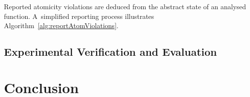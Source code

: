 Reported atomicity violations are deduced from the abstract state of
an analysed function. A~simplified reporting process illustrates
Algorithm~\ref{alg:reportAtomViolations}.

\begin{algorithm}[hbt]



    \caption{%
        Reporting of atomicity violations from the abstract state of
        an analysed function
    }
    \label{alg:reportAtomViolations}
\end{algorithm}


\section{Experimental Verification and Evaluation}
\label{sec:exp}
\cite{deadlockKroening}




\chapter{Conclusion}
\label{chap:conc}



